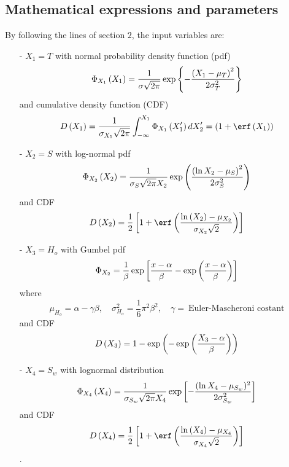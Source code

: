 \subsection{Mathematical expressions and parameters}
By following the lines of section $2$, the input variables are:
\begin{itemize}
\item[-] $X_1=T$ with normal probability density function (pdf)
\begin{equation*}
\Phi_{X_1}\left( X_1 \right) = \frac{1}{\sigma \sqrt{2 \pi}}\exp\left\lbrace - \frac{\left( X_{1} - \mu_{T} \right)^2} {2 \sigma_{T}^{2}} \right\rbrace
\end{equation*}
and cumulative density function (CDF)
\begin{equation*}
D\rbkt{X_{1}} = \frac{1}{\sigma_{X_{1}}\sqrt{2 \pi}}\int_{-\infty}^{X_{1}} \Phi_{X_{1}}\rbkt{X_{1}'}d X_{2}' = \rbkt{1+\erf\rbkt{X_1}}
\end{equation*}
\item[-] $X_2=S$ with log-normal pdf 
\begin{equation*}
\Phi_{X_{2}}\left( X_{2} \right) =\frac{1}{\sigma_{S} \sqrt{2 \pi} X_{2}}\exp\left(  \frac{\left( \ln X_{2} - \mu_{S} \right)^2}{2 \sigma_{S}^{2}} \right)
\end{equation*}
and CDF
\begin{equation*}
D\rbkt{X_{2}}= \frac{1}{2}\sbkt{1 + \erf \rbkt{\frac {\ln \rbkt{X_{2}} - \mu_{X_{2}}}{\sigma_{X_{2}} \sqrt{2}}}}
\end{equation*}
\item[-] $X_3=H_o$ with Gumbel pdf 
\begin{equation*}
\Phi_{X_{2}} =\frac{1}{\beta}\exp\left[ \frac { x - \alpha}{\beta} -  \exp \left( \frac {x - \alpha} {\beta} \right) \right]
\end{equation*}
where 
\begin{equation*}
\mu_{H_{o}} = \alpha - \gamma \beta 
			 , \quad \sigma_{H_{o}}^2  = \frac{1}{6}\pi^{2} \beta^{2} ,\quad 
			 \gamma = ~ \text{Euler-Mascheroni costant}
\end{equation*}
and CDF
\begin{equation*}
D\left( X_{3} \right) = 1 - \exp\left( -\exp\left( \frac {X_{3} - \alpha}{\beta} \right) \right)
\end{equation*}
\item[-]$X_{4}=S_{w}$ with lognormal distribution
\begin{equation*}
\Phi_{X_{4}}\left( X_{4} \right) = \frac{1}{\sigma_{S_{w}} \sqrt{2 \pi} X_{4}}\exp\left[ - \frac{(\ln X_{4} - \mu_{S_{w}})^2}{2 \sigma_{S_{w}}^2} \right]
\end{equation*}
and CDF
\begin{equation*}
D\rbkt{X_{4}} = \frac{1}{2}\sbkt{ 1 + \erf \rbkt{\frac {\ln \rbkt{X_{4}} - \mu_{X_{4}}}{\sigma_{X_{4}} \sqrt{2}}}}
\end{equation*}
			.
\end{itemize}
